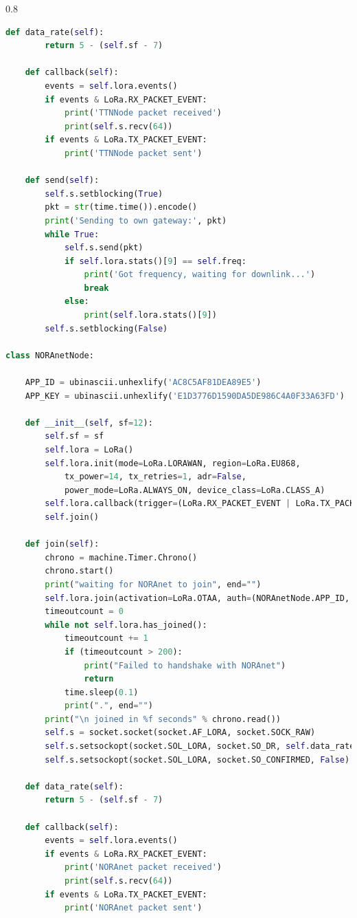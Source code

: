 \documentclass[12pt]{article}
\begin{document}
\begin{spacing}{0.8}
\begin{lstlisting}[language=Python]
    def data_rate(self):
        return 5 - (self.sf - 7)

    def callback(self):
        events = self.lora.events()
        if events & LoRa.RX_PACKET_EVENT:
            print('TTNNode packet received')
            print(self.s.recv(64))
        if events & LoRa.TX_PACKET_EVENT:
            print('TTNNode packet sent')

    def send(self):
        self.s.setblocking(True)
        pkt = str(time.time()).encode()
        print('Sending to own gateway:', pkt)
        while True:
            self.s.send(pkt)
            if self.lora.stats()[9] == self.freq:
                print('Got frequency, waiting for downlink...')
                break
            else:
                print(self.lora.stats()[9])
        self.s.setblocking(False)

class NORAnetNode:

    APP_ID = ubinascii.unhexlify('AC8C5AF81DEA89E5')
    APP_KEY = ubinascii.unhexlify('E1D3776D1590DA5DE986C4A0F33A63FD')

    def __init__(self, sf=12):
        self.sf = sf
        self.lora = LoRa()
        self.lora.init(mode=LoRa.LORAWAN, region=LoRa.EU868,
            tx_power=14, tx_retries=1, adr=False,
            power_mode=LoRa.ALWAYS_ON, device_class=LoRa.CLASS_A)
        self.lora.callback(trigger=(LoRa.RX_PACKET_EVENT | LoRa.TX_PACKET_EVENT), handler=self.callback)
        self.join()

    def join(self):
        chrono = machine.Timer.Chrono()
        chrono.start()
        print("waiting for NORAnet to join", end="")
        self.lora.join(activation=LoRa.OTAA, auth=(NORAnetNode.APP_ID, NORAnetNode.APP_KEY), timeout=0, dr=self.data_rate())
        timeoutcount = 0
        while not self.lora.has_joined():
            timeoutcount += 1
            if (timeoutcount > 200):
                print("Failed to handshake with NORAnet")
                return
            time.sleep(0.1)
            print(".", end="")
        print("\n joined in %f seconds" % chrono.read())
        self.s = socket.socket(socket.AF_LORA, socket.SOCK_RAW)
        self.s.setsockopt(socket.SOL_LORA, socket.SO_DR, self.data_rate())   # Data Rate
        self.s.setsockopt(socket.SOL_LORA, socket.SO_CONFIRMED, False)       # ACK

    def data_rate(self):
        return 5 - (self.sf - 7)

    def callback(self):
        events = self.lora.events()
        if events & LoRa.RX_PACKET_EVENT:
            print('NORAnet packet received')
            print(self.s.recv(64))
        if events & LoRa.TX_PACKET_EVENT:
            print('NORAnet packet sent')


\end{lstlisting}
\end{spacing}
\end{document}
